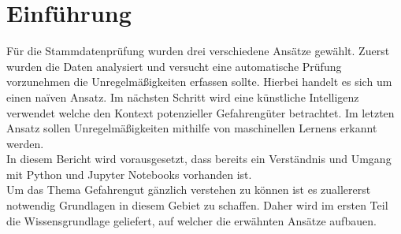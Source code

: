 \section{Einführung}

Für die Stammdatenprüfung wurden drei verschiedene Ansätze gewählt. Zuerst
wurden die Daten analysiert und versucht eine automatische Prüfung vorzunehmen
die Unregelmäßigkeiten erfassen sollte. Hierbei handelt es sich um einen
na\"iven Ansatz. Im nächsten Schritt wird eine künstliche Intelligenz verwendet
welche den Kontext potenzieller Gefahrengüter betrachtet. Im letzten Ansatz
sollen Unregelmäßigkeiten mithilfe von maschinellen Lernens erkannt werden.\\

In diesem Bericht wird vorausgesetzt, dass bereits ein Verständnis und Umgang
mit Python und Jupyter Notebooks vorhanden ist.\\

Um das Thema Gefahrengut gänzlich verstehen zu können ist es zuallererst
notwendig Grundlagen in diesem Gebiet zu schaffen. Daher wird im ersten Teil
die Wissensgrundlage geliefert, auf welcher die erwähnten Ansätze aufbauen.
